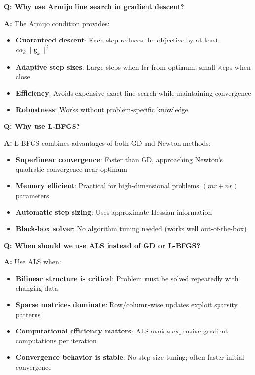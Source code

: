 \documentclass[11pt,oneside]{article}
\newcommand{\question}[1]{\textbf{Q: #1}}
\newcommand{\answer}{\textbf{A: }}
\begin{document}
\medskip

\question{Why use Armijo line search in gradient descent?}

\answer The Armijo condition provides:
\begin{itemize}
    \item \textbf{Guaranteed descent}: Each step reduces the objective by at least $c\alpha_k \|\mathbf{g}_k\|^2$
    \item \textbf{Adaptive step sizes}: Large steps when far from optimum, small steps when close
    \item \textbf{Efficiency}: Avoids expensive exact line search while maintaining convergence
    \item \textbf{Robustness}: Works without problem-specific knowledge
\end{itemize}

\medskip

\question{Why use L-BFGS?}

\answer L-BFGS combines advantages of both GD and Newton methods:
\begin{itemize}
    \item \textbf{Superlinear convergence}: Faster than GD, approaching Newton's quadratic convergence near optimum
    \item \textbf{Memory efficient}: Practical for high-dimensional problems $(mr + nr)$ parameters
    \item \textbf{Automatic step sizing}: Uses approximate Hessian information
    \item \textbf{Black-box solver}: No algorithm tuning needed (works well out-of-the-box)
\end{itemize}

\medskip

\question{When should we use ALS instead of GD or L-BFGS?}

\answer Use ALS when:
\begin{itemize}
    \item \textbf{Bilinear structure is critical}: Problem must be solved repeatedly with changing data
    \item \textbf{Sparse matrices dominate}: Row/column-wise updates exploit sparsity patterns
    \item \textbf{Computational efficiency matters}: ALS avoids expensive gradient computations per iteration
    \item \textbf{Convergence behavior is stable}: No step size tuning; often faster initial convergence
\end{itemize}
\end{document}
